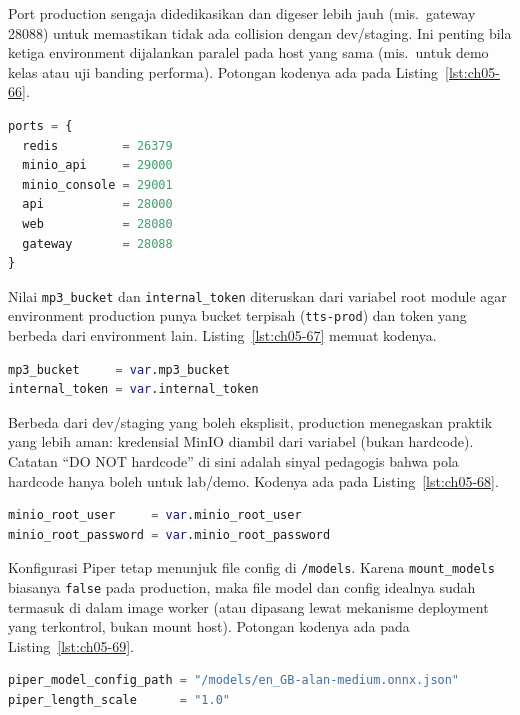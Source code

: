 Port production sengaja didedikasikan dan digeser lebih jauh (mis.\ gateway 28088) untuk memastikan tidak ada collision dengan dev/staging. Ini penting bila ketiga environment dijalankan paralel pada host yang sama (mis.\ untuk demo kelas atau uji banding performa). Potongan kodenya ada pada Listing~\ref{lst:ch05-66}.

\begin{lstlisting}[language=terraform, caption={Potongan kode Terraform pada main.tf (19)}, label={lst:ch05-66}]
ports = {
  redis         = 26379
  minio_api     = 29000
  minio_console = 29001
  api           = 28000
  web           = 28080
  gateway       = 28088
}
\end{lstlisting}

Nilai \texttt{mp3\_bucket} dan \texttt{internal\_token} diteruskan dari variabel root module agar environment production punya bucket terpisah (\texttt{tts-prod}) dan token yang berbeda dari environment lain. Listing~\ref{lst:ch05-67} memuat kodenya.

\begin{lstlisting}[language=terraform, caption={Potongan kode Terraform pada main.tf (20)}, label={lst:ch05-67}]
mp3_bucket     = var.mp3_bucket
internal_token = var.internal_token
\end{lstlisting}

Berbeda dari dev/staging yang boleh eksplisit, production menegaskan praktik yang lebih aman: kredensial MinIO diambil dari variabel (bukan hardcode). Catatan ``DO NOT hardcode'' di sini adalah sinyal pedagogis bahwa pola hardcode hanya boleh untuk lab/demo. Kodenya ada pada Listing~\ref{lst:ch05-68}.

\begin{lstlisting}[language=terraform, caption={Potongan kode Terraform pada main.tf (21)}, label={lst:ch05-68}]
minio_root_user     = var.minio_root_user
minio_root_password = var.minio_root_password
\end{lstlisting}

Konfigurasi Piper tetap menunjuk file config di \texttt{/models}. Karena \texttt{mount\_models} biasanya \texttt{false} pada production, maka file model dan config idealnya sudah termasuk di dalam image worker (atau dipasang lewat mekanisme deployment yang terkontrol, bukan mount host). Potongan kodenya ada pada Listing~\ref{lst:ch05-69}.

\begin{lstlisting}[language=terraform, caption={Potongan kode Terraform pada main.tf (22)}, label={lst:ch05-69}]
piper_model_config_path = "/models/en_GB-alan-medium.onnx.json"
piper_length_scale      = "1.0"
\end{lstlisting}

